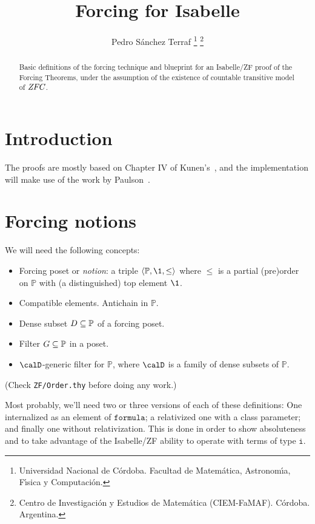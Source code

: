 \documentclass[11pt,english]{article}
\renewcommand{\PP}{\mathbb{P}}
\newcommand{\formula}{\ensuremath{\mathtt{formula}}}
\newcommand{\tyi}{\mathtt{i}}
\begin{document}
\title{Forcing for Isabelle}
\author{%
  Pedro Sánchez Terraf%
  \thanks{
    Universidad Nacional de C\'ordoba. 
    Facultad de Matem\'atica, Astronom\'{\i}a,  F\'{\i}sica y
    Computaci\'on.}
  \thanks{
    Centro de Investigaci\'on y Estudios de Matem\'atica (CIEM-FaMAF).
    C\'ordoba. Argentina.}
}
%
\maketitle
%
\begin{abstract}
  Basic definitions of the forcing technique and blueprint for an
  Isabelle/ZF proof of the Forcing Theorems, under the assumption of
  the existence of countable transitive model of $\mathit{ZFC}$.   
\end{abstract}


%
\section{Introduction}
The proofs are mostly based on Chapter IV of
Kunen's~\cite{kunen2011set}, and the implementation will make use of
the work by Paulson~\cite{paulson_2003}. 

\section{Forcing notions}
We will need the following concepts:
\begin{itemize}
\item Forcing poset or \emph{notion}: a triple $\lb \PP, \1, \leq\rb$ where $\leq$ is a
  partial (pre)order on $\PP$ with (a distinguished) top element $\1$.
\item Compatible elements. Antichain in $\PP$. 
\item Dense subset $D\sbq\PP$ of a forcing poset.
\item Filter $G\sbq\PP$ in a poset.
\item $\calD$-generic filter for $\PP$, where $\calD$ is a family of
  dense subsets of $\PP$.
\end{itemize}
(Check \verb|ZF/Order.thy| before doing any work.)

Most probably, we'll need two or three versions of each of these
definitions: One internalized as an element of \formula;  a relativized
one with a class parameter; and finally one without
relativization. This is done in order to show absoluteness and to take
advantage of the Isabelle/ZF ability to operate with terms of type
$\tyi$.
\end{document}
